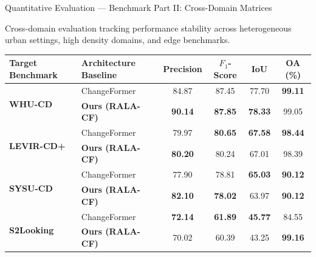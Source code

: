 \documentclass[aspectratio=169]{beamer}
\begin{document}
\begin{frame}{Quantitative Evaluation — Benchmark Part II: Cross-Domain Matrices}

\centering
{\footnotesize Cross-domain evaluation tracking performance stability across heterogeneous urban settings, high density domains, and edge benchmarks.}
\vskip 0.25cm

\renewcommand{\arraystretch}{1.15}
\small
\begin{tabular}{|l|l|c|c|c|c|}
\hline
\textbf{Target Benchmark} & \textbf{Architecture Baseline} & \textbf{Precision} & \textbf{$F_1$-Score} & \textbf{IoU} & \textbf{OA (\%)} \\
\hline
\hline
\multirow{2}{*}{\textbf{WHU-CD}}    & ChangeFormer & 84.87 & 87.45 & 77.70 & \textbf{99.11} \\ \cline{2-6}
                           & \textbf{Ours (RALA-CF)} & \cellcolor{pastelorange}\textbf{90.14} & \cellcolor{pastelorange}\textbf{87.85} & \cellcolor{pastelorange}\textbf{78.33} & \cellcolor{pastelorange} 99.05 \\
\hline
\hline
\multirow{2}{*}{\textbf{LEVIR-CD+}} & ChangeFormer & 79.97 & \textbf{80.65} & \textbf{67.58} & \textbf{98.44} \\ \cline{2-6}
                           & \textbf{Ours (RALA-CF)} & \cellcolor{pastelorange}\textbf{80.20} & \cellcolor{pastelorange} 80.24 & \cellcolor{pastelorange} 67.01 & \cellcolor{pastelorange} 98.39 \\
\hline
\hline
\multirow{2}{*}{\textbf{SYSU-CD}}   & ChangeFormer & 77.90 & 78.81 & \textbf{65.03} & \textbf{90.12} \\ \cline{2-6}
                           & \textbf{Ours (RALA-CF)} & \cellcolor{pastelorange}\textbf{82.10} & \cellcolor{pastelorange}\textbf{78.02} & \cellcolor{pastelorange} 63.97 & \cellcolor{pastelorange}\textbf{90.12} \\
\hline
\hline
\multirow{2}{*}{\textbf{S2Looking}} & ChangeFormer & \textbf{72.14} & \textbf{61.89} & \textbf{45.77} & 84.55 \\ \cline{2-6}
                           & \textbf{Ours (RALA-CF)} & \cellcolor{pastelorange} 70.02 & \cellcolor{pastelorange} 60.39 & \cellcolor{pastelorange} 43.25 & \cellcolor{pastelorange}\textbf{99.16} \\
\hline
\end{tabular}

\end{frame}
\end{document}
